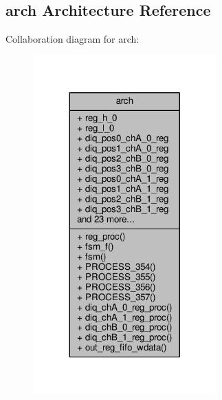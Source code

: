 \subsection{arch Architecture Reference}
\label{classrxiq__pulse__ddr_1_1arch}


Collaboration diagram for arch\+:\nopagebreak
\begin{figure}[H]
\begin{center}
\leavevmode
\includegraphics[width=200pt]{d9/dc0/classrxiq__pulse__ddr_1_1arch__coll__graph}
\end{center}
\end{figure}
